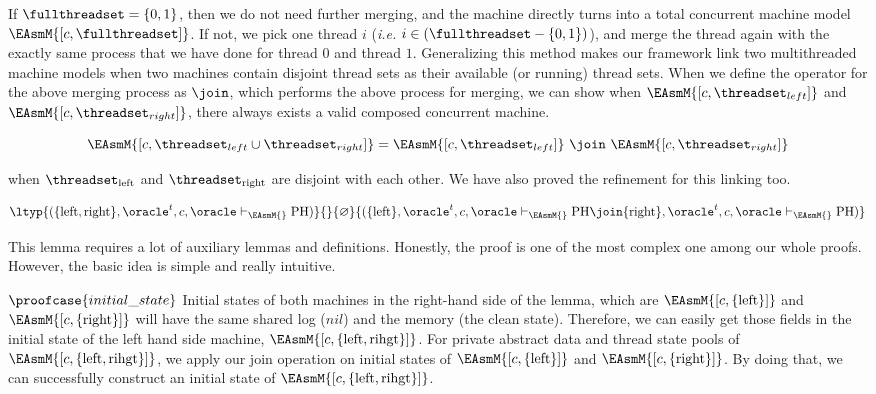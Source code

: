 If $\fullthreadset = \{0, 1\}$, then we do not need further merging, 
and the machine directly turns into a total concurrent machine 
model $\EAsmM{[c, \fullthreadset]}$. 
If not, we pick one thread $i$ (\textit{i.e.} $i \in (\fullthreadset - \{0, 1\})$), 
and merge the thread again with the exactly 
same process that we have done for thread $0$ and thread $1$.
Generalizing this method makes our framework link two multithreaded machine models 
when two machines contain disjoint thread sets as their available (or running) thread sets.
When we define the operator for the above merging process as $\join$, which performs the above 
process for merging,
we can show when $\EAsmM{[c, \threadset_{left}]}$ and $\EAsmM{[c, \threadset_{right}]}$,
there always exists a valid composed concurrent machine.
\begin{small}
\[
\EAsmM{[c, \threadset_{left} \cup \threadset_{right}]} = \EAsmM{[c, \threadset_{left}]}\ \join\ \EAsmM{[c, \threadset_{right}]}
 \]
 \end{small}
when $\threadset_{\mathrm{left}}$ and $\threadset_{\mathrm{right}}$ are disjoint with each other.
We have also proved the refinement for this linking too.

\begin{lemma}
\begin{small}
$$\ltyp{(\{\mathrm{left}, \mathrm{right}\}, \oracle^t, c, \oracle  \vdash_{\EAsmM{}} \mathrm{PH})}{}{\varnothing}
{(\{\mathrm{left}\}, \oracle^t, c, \oracle \vdash_{\EAsmM{}} \mathrm{PH}
 \join \{\mathrm{right}\}, \oracle^t, c, \oracle  \vdash_{\EAsmM{}} \mathrm{PH})}
$$
\end{small}
\label{lemma:thread-single-compose}
\end{lemma}%
This lemma requires a lot of auxiliary lemmas and definitions.
Honestly, the proof is one of the most complex one among our whole proofs.
However, the basic idea is simple and really intuitive.


$\proofcase{initial\_state}$ 
Initial states of both machines in the right-hand side of the lemma, 
which are $\EAsmM{[c, \mathrm{\{left\}}]}$ and $\EAsmM{[c, \mathrm{\{right\}}]}$
will have the same shared log ($nil$) and the memory (the clean state). 
Therefore, we can easily  get those fields in the initial state 
of the left hand side machine, $\EAsmM{[c, \mathrm{\{left, rihgt\}}]}$.
For private abstract data and thread state pools of $\EAsmM{[c, \mathrm{\{left, rihgt\}}]}$, 
we apply our join operation on initial states of $\EAsmM{[c, \mathrm{\{left\}}]}$ and $\EAsmM{[c, \mathrm{\{right\}}]}$. 
By doing that, we can successfully construct an initial state of $\EAsmM{[c, \mathrm{\{left, rihgt\}}]}$.

